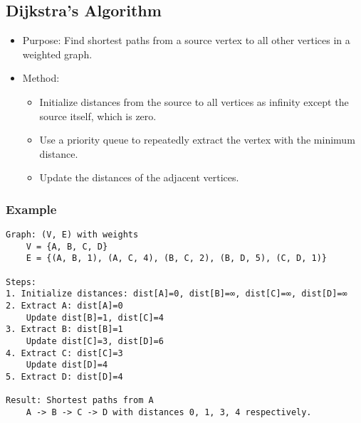 \documentclass[10pt]{article}
\begin{document}
\subsection{Dijkstra's Algorithm}
\begin{itemize}
    \item Purpose: Find shortest paths from a source vertex to all other vertices in a weighted graph.
    \item Method:
    \begin{itemize}
        \item Initialize distances from the source to all vertices as infinity except the source itself, which is zero.
        \item Use a priority queue to repeatedly extract the vertex with the minimum distance.
        \item Update the distances of the adjacent vertices.
    \end{itemize}
\end{itemize}

\subsubsection*{Example}
\begin{verbatim}
Graph: (V, E) with weights
    V = {A, B, C, D}
    E = {(A, B, 1), (A, C, 4), (B, C, 2), (B, D, 5), (C, D, 1)}

Steps:
1. Initialize distances: dist[A]=0, dist[B]=∞, dist[C]=∞, dist[D]=∞
2. Extract A: dist[A]=0
    Update dist[B]=1, dist[C]=4
3. Extract B: dist[B]=1
    Update dist[C]=3, dist[D]=6
4. Extract C: dist[C]=3
    Update dist[D]=4
5. Extract D: dist[D]=4

Result: Shortest paths from A
    A -> B -> C -> D with distances 0, 1, 3, 4 respectively.
\end{verbatim}
\end{document}
